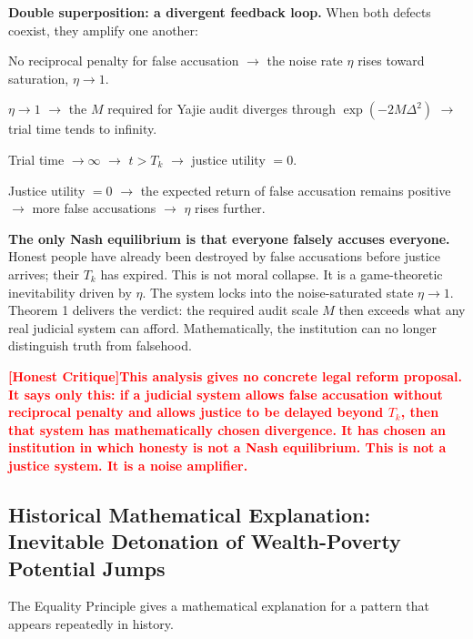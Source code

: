 \documentclass[12pt,a4paper]{article}
\theoremstyle{remark}
\newcommand{\honestcrit}[1]{%
    \textcolor{red}{\textbf{[Honest Critique]#1}}%
}
\begin{document}
\textbf{Double superposition: a divergent feedback loop.} When both defects coexist, they amplify one another:

\begin{compactenum}
    \item No reciprocal penalty for false accusation $\to$ the noise rate $\eta$ rises toward saturation, $\eta \to 1$.
    \item $\eta \to 1$ $\to$ the $M$ required for Yajie audit diverges through $\exp(-2M\Delta^2)$ $\to$ trial time tends to infinity.
    \item Trial time $\to \infty$ $\to$ $t > T_k$ $\to$ justice utility $= 0$.
    \item Justice utility $= 0$ $\to$ the expected return of false accusation remains positive $\to$ more false accusations $\to$ $\eta$ rises further.
\end{compactenum}

\textbf{The only Nash equilibrium is that everyone falsely accuses everyone.} Honest people have already been destroyed by false accusations before justice arrives; their $T_k$ has expired. This is not moral collapse. It is a game-theoretic inevitability driven by $\eta$. The system locks into the noise-saturated state $\eta \to 1$. Theorem 1 delivers the verdict: the required audit scale $M$ then exceeds what any real judicial system can afford. Mathematically, the institution can no longer distinguish truth from falsehood.

\honestcrit{This analysis gives no concrete legal reform proposal. It says only this: if a judicial system allows false accusation without reciprocal penalty and allows justice to be delayed beyond $T_k$, then that system has mathematically chosen divergence. It has chosen an institution in which honesty is not a Nash equilibrium. This is not a justice system. It is a noise amplifier.}

\subsection{Historical Mathematical Explanation: Inevitable Detonation of Wealth-Poverty Potential Jumps}

The Equality Principle gives a mathematical explanation for a pattern that appears repeatedly in history.
\end{document}
